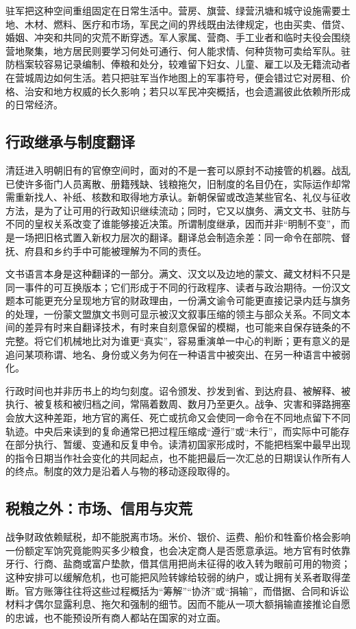 驻军把这种空间重组固定在日常生活中。营房、旗营、绿营汛塘和城守设施需要土地、木材、燃料、医疗和市场，军民之间的界线既由法律规定，也由买卖、借贷、婚姻、冲突和共同的灾荒不断穿透。军人家属、营商、手工业者和临时夫役会围绕营地聚集，地方居民则要学习何处可通行、何人能求情、何种货物可卖给军队。驻防档案较容易记录编制、俸粮和处分，较难留下妇女、儿童、雇工以及无籍流动者在营城周边如何生活。若只把驻军当作地图上的军事符号，便会错过它对房租、价格、治安和地方权威的长久影响；若只以军民冲突概括，也会遗漏彼此依赖所形成的日常经济。

\subsection*{行政继承与制度翻译}
清廷进入明朝旧有的官僚空间时，面对的不是一套可以原封不动接管的机器。战乱已使许多衙门人员离散、册籍残缺、钱粮拖欠，旧制度的名目仍在，实际运作却常需重新找人、补纸、核数和取得地方承认。新朝保留或改造某些官名、礼仪与征收方法，是为了让可用的行政知识继续流动；同时，它又以旗务、满文文书、驻防与不同的皇权关系改变了谁能够接近决策。所谓制度继承，因而并非“明制不变”，而是一场把旧格式置入新权力层次的翻译。翻译总会制造余差：同一命令在部院、督抚、府县和乡约手中可能被理解为不同的责任。

文书语言本身是这种翻译的一部分。满文、汉文以及边地的蒙文、藏文材料不只是同一事件的可互换版本；它们形成于不同的行政程序、读者与政治期待。一份汉文题本可能更充分呈现地方官的财政理由，一份满文谕令可能更直接记录内廷与旗务的处理，一份蒙文盟旗文书则可显示被汉文叙事压缩的领主与部众关系。不同文本间的差异有时来自翻译技术，有时来自刻意保留的模糊，也可能来自保存链条的不完整。将它们机械地比对为谁更“真实”，容易重演单一中心的判断；更有意义的是追问某项称谓、地名、身份或义务为何在一种语言中被突出、在另一种语言中被弱化。

行政时间也并非历书上的均匀刻度。诏令颁发、抄发到省、到达府县、被解释、被执行、被复核和被归档之间，常隔着数周、数月乃至更久。战争、灾害和驿路拥塞会放大这种差距，地方官的离任、死亡或抗命又会使同一命令在不同地点留下不同轨迹。中央后来读到的复命通常已把过程压缩成“遵行”或“未行”，而实际中可能存在部分执行、暂缓、变通和反复申令。读清初国家形成时，不能把档案中最早出现的指令日期当作社会变化的共同起点，也不能把最后一次汇总的日期误认作所有人的终点。制度的效力是沿着人与物的移动逐段取得的。

\subsection*{税粮之外：市场、信用与灾荒}
战争财政依赖赋税，却不能脱离市场。米价、银价、运费、船价和牲畜价格会影响一份额定军饷究竟能购买多少粮食，也会决定商人是否愿意承运。地方官有时依靠牙行、行商、盐商或富户垫款，借其信用把尚未征得的收入转为眼前可用的物资；这种安排可以缓解危机，也可能把风险转嫁给较弱的纳户，或让拥有关系者取得垄断。官方账簿往往将这些过程概括为“筹解”“协济”或“捐输”，而借据、合同和诉讼材料才偶尔显露利息、拖欠和强制的细节。因而不能从一项大额捐输直接推论自愿的忠诚，也不能预设所有商人都站在国家的对立面。

